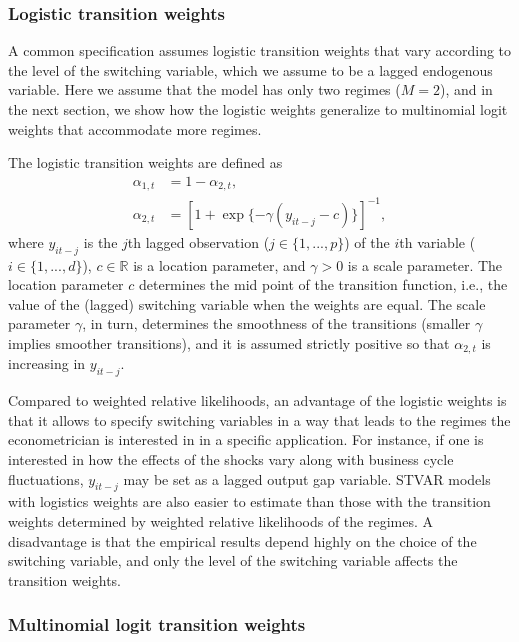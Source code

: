 \documentclass[nojss]{jss}
\begin{document}
\subsubsection{Logistic transition weights}\label{sec:logistic_weights}

A common specification assumes logistic transition weights \citep[e.g.,][]{Anderson+Vahid:1998} that vary according to the level of the switching variable, which we assume to be a lagged endogenous variable. Here we assume that the model has only two regimes ($M=2$), and in the next section, we show how the logistic weights generalize to multinomial logit weights that accommodate more regimes.

The logistic transition weights are defined as
\begin{align}
\alpha_{1,t} &= 1 - \alpha_{2,t},\\
\alpha_{2,t} &= [1 + \exp\lbrace -\gamma(y_{it-j} - c)\rbrace ]^{-1},
\end{align}
where $y_{it-j}$ is the $j$th lagged observation ($j\in \lbrace 1,...,p \rbrace$) of the $i$th variable ($i\in \lbrace 1,...,d \rbrace$), $c\in\mathbb{R}$ is a location parameter, and $\gamma > 0$ is a scale parameter. The location parameter $c$ determines the mid point of the transition function, i.e., the value of the (lagged) switching variable when the weights are equal. The scale parameter $\gamma$, in turn,  determines the smoothness of the transitions (smaller $\gamma$ implies smoother transitions), and it is assumed strictly positive so that $\alpha_{2,t}$ is increasing in $y_{it-j}$.

Compared to weighted relative likelihoods, an advantage of the logistic weights is that it allows to specify switching variables in a way that leads to the regimes the econometrician is interested in in a specific application. For instance, if one is interested in how the effects of the shocks vary along with business cycle fluctuations, $y_{it-j}$ may be set as a lagged output gap variable. STVAR models with logistics weights are also easier to estimate than those with the transition weights determined by weighted relative likelihoods of the regimes. A disadvantage is that the empirical results depend highly on the choice of the switching variable, and only the level of the switching variable affects the transition weights.

\subsubsection{Multinomial logit transition weights}
\end{document}
